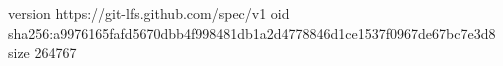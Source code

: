 version https://git-lfs.github.com/spec/v1
oid sha256:a9976165fafd5670dbb4f998481db1a2d4778846d1ce1537f0967de67bc7e3d8
size 264767
